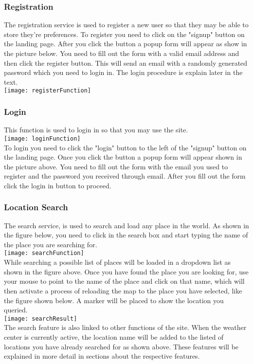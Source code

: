 \subsubsection{Registration}
The registration service is used to register a new user so that they may be able to store they're preferences. To register you need to click on the "signup" button on the landing page. After you click the button a popup form will appear as show in the picture below. You need to fill out the form with a valid email address and then click the register button. This will send an email with a randomly generated password which you need to login in. The login procedure is explain later in the text. \\[0.5cm]
\texttt{[image: registerFunction]} \\[0.5cm]
\subsubsection{Login}
This function is used to login in so that you may use the site. \\[0.5cm]
\texttt{[image: loginFunction]} \\[0.5cm]
To login you need to click the "login" button to the left of the "signup" button on the landing page. Once you click the button a popup form will appear shown in the picture above. You need to fill out the form with the email you used to register and the password you received through email. After you fill out the form click the login in button to proceed.
\subsubsection{Location Search}
The search service, is used to search and load any place in the world. As shown in the figure below, you need to click in the search box and start typing the name of the place you are searching for. \\[0.5cm]
\texttt{[image: searchFunction]} \\[0.5cm]
While searching a possible list of places will be loaded in a dropdown list as shown in the figure above. Once you have found the place you are looking for, use your mouse to point to the name of the place and click on that name, which will then activate a process of reloading the map to the place you have selected, like the figure shown below. A marker will be placed to show the location you queried. \\[0.5cm]
\texttt{[image: searchResult]} \\[0.5cm]
The search feature is also linked to other functions of the site. When the weather center is currently active, the location name will be added to the listed of locations you have already searched for as shown above. These features will be explained in more detail in sections about the respective features.
